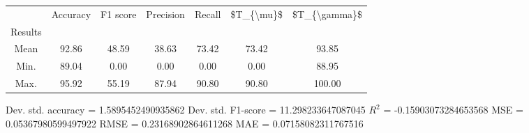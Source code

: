 \begin{tabular}{|c|c|c|c|c|c|c|}
\toprule
{} &  Accuracy &  F1 score &  Precision &  Recall &  \$T\_\{\textbackslash mu\}\$ &  \$T\_\{\textbackslash gamma\}\$ \\
Results &           &           &            &         &            &               \\
\hline
Mean    &     92.86 &     48.59 &      38.63 &   73.42 &      73.42 &         93.85 \\
Min.    &     89.04 &      0.00 &       0.00 &    0.00 &       0.00 &         88.95 \\
Max.    &     95.92 &     55.19 &      87.94 &   90.80 &      90.80 &        100.00 \\
\bottomrule
\end{tabular}

 Dev. std. accuracy = 1.5895452490935862
 Dev. std. F1-score = 11.298233647087045
 $R^2$ = -0.15903073284653568
 MSE = 0.05367980599497922
 RMSE = 0.23168902864611268
 MAE = 0.07158082311767516